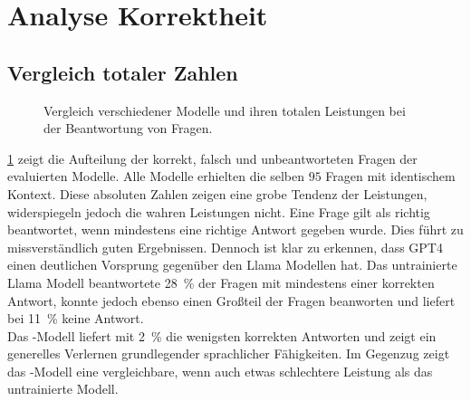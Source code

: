 \section{Analyse Korrektheit}\label{sec:results:correctness}
\subsection{Vergleich totaler Zahlen}
\begin{figure}
    \caption{Vergleich verschiedener Modelle und ihren totalen Leistungen bei der Beantwortung von Fragen.}
    \label{fig:results:answers_total}
\end{figure}
\cref{fig:results:answers_total} zeigt die Aufteilung der korrekt, falsch und unbeantworteten Fragen der evaluierten Modelle.
Alle Modelle erhielten die selben $95$ Fragen mit identischem Kontext.
Diese absoluten Zahlen zeigen eine grobe Tendenz der Leistungen, widerspiegeln jedoch die wahren Leistungen nicht.
Eine Frage gilt als richtig beantwortet, wenn mindestens eine richtige Antwort gegeben wurde.
Dies führt zu missverständlich guten Ergebnissen.
Dennoch ist klar zu erkennen, dass GPT4 einen deutlichen Vorsprung gegenüber den Llama Modellen hat.
Das untrainierte Llama Modell beantwortete \SI{28}{\percent} der Fragen mit mindestens einer korrekten Antwort, konnte jedoch ebenso einen Großteil der Fragen beanworten und liefert bei \SI{11}{\percent} keine Antwort.\\

Das \liv-Modell liefert mit \SI{2}{\percent} die wenigsten korrekten Antworten und zeigt ein generelles Verlernen grundlegender sprachlicher Fähigkeiten.
Im Gegenzug zeigt das \lia-Modell eine vergleichbare, wenn auch etwas schlechtere Leistung als das untrainierte Modell.\\

